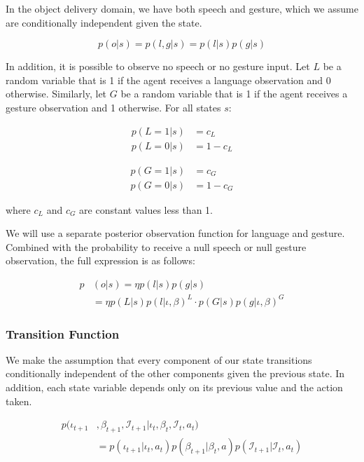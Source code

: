 \documentclass[conference]{IEEEtran}
\newcommand{\Iota}{\mathcal{I}}
\begin{document}
In the object delivery domain, we have both speech and gesture, which we assume are conditionally independent given the state. 

$$p(o|s) = p(l, g | s) =  p(l|s)p(g|s)$$

In addition, it is possible to observe no speech or no gesture input. Let $L$ be a random variable that is 1 if the agent receives a language observation and 0 otherwise. Similarly, let $G$ be a random variable that is 1 if the agent receives a gesture observation and 1 otherwise. For all states $s$: 

\begin{align*}
	p(L = 1 | s) &= c_L \\
	p(L = 0 | s) &= 1 - c_L 
\end{align*}

\begin{align*}
	p(G = 1 | s) &= c_G \\
	p(G = 0 | s) &= 1 - c_G 
\end{align*}

where $c_L$ and $c_G$ are constant values less than 1. 

We will use a separate posterior observation function for language and gesture. Combined with the probability to receive a null speech or null gesture observation, the full expression is as follows: 



\begin{align*}
	p&(o|s) = \eta p(l|s) p(g|s)  \\
	 &= \eta p(L|s) p(l|\iota,\beta) ^ L \cdot p(G|s) p(g|\iota,\beta)^G
\end{align*}



\subsubsection{Transition Function} \label{sssec:tf}

We make the assumption that every component of our state transitions conditionally independent of the other components given the previous state. In addition, each state variable depends only on its previous value and the action taken. 

\begin{align*}
	p(\iota_{t+1}&, \beta_{t+1}, \Iota_{t+1} | \iota_t, \beta_t, \Iota_t, a_t) \\
	&=  p(\iota_{t+1} | \iota_t, a_t) p(\beta_{t+1} | \beta_t, a) p(\Iota_{t+1} | \Iota_t, a_t)
\end{align*}
\end{document}
